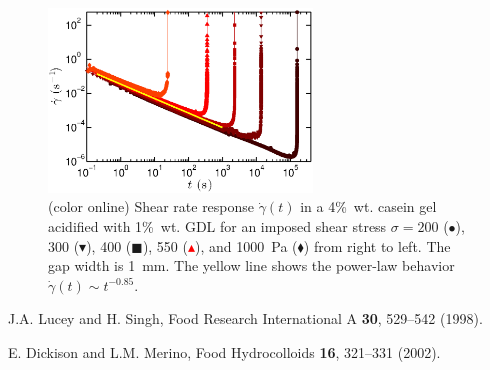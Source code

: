 \documentclass[twocolumn,superscriptaddress,showpacs,preprintnumbers,amsmath,amssymb,prl]{revtex4}
\newcommand\gp{\dot\gamma}
\begin{document}
\begin{figure}[h]
\centering
\includegraphics[width=7cm,clip]{SuppFig2.eps}
\caption{(color online) Shear rate response $\gp(t)$ in a 4\%~wt. casein gel acidified with 1\%~wt. GDL for an imposed shear stress $\sigma=200$ (\textcolor{red!25!black}{$\bullet$}), 300 (\textcolor{red!50!black}{$\blacktriangledown$}), 400 (\textcolor{red!75!black}{$\blacksquare$}), 550 (\textcolor{red}{$\blacktriangle$}), and 1000~Pa (\textcolor{orange!50!red}{$\blacklozenge$}) from right to left. The gap width is 1~mm. The yellow line shows the power-law behavior $\gp(t)\sim t^{-0.85}$.
\label{suppfig2}}
\end{figure} 

\begin{thebibliography}{}

 J.A. Lucey and H. Singh, Food Research International A {\bf 30}, 529--542 (1998).

 E. Dickison and L.M. Merino, Food Hydrocolloids {\bf 16}, 321--331 (2002).

\end{thebibliography}
\end{document}
